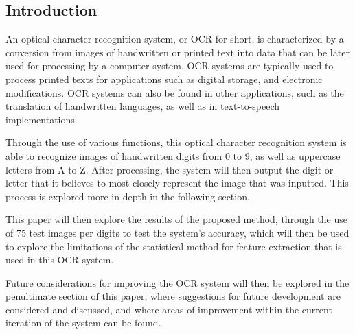 \documentclass{article}
\begin{document}
\begin{multicols}{2}
\section{Introduction}
An optical character recognition system, or OCR for short, is characterized by a conversion from images of handwritten or printed text into data that can be later used for processing by a computer system. OCR systems are typically used to process printed texts for applications such as digital storage, and electronic modifications. OCR systems can also be found in other applications, such as the translation of handwritten languages, as well as in text-to-speech implementations. \par
Through the use of various functions, this optical character recognition system is able to recognize images of handwritten digits from 0 to 9, as well as uppercase letters from A to Z. After processing, the system will then output the digit or letter that it believes to most closely represent the image that was inputted. This process is explored more in depth in the following section.  \par
This paper will then explore the results of the proposed method, through the use of 75 test images per digits to test the system’s accuracy, which will then be used to explore the limitations of the statistical method for feature extraction that is used in this OCR system. \par
Future considerations for improving the OCR system will then be explored in the penultimate section of this paper, where suggestions for future development are considered and discussed, and where areas of improvement within the current iteration of the system can be found. \par


\end{multicols}
\end{document}
